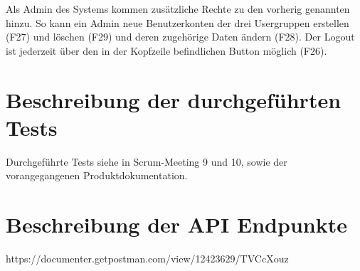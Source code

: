 \documentclass[a4paper,report,headsepline]{scrreprt}
\begin{document}
Als Admin des Systems kommen zusätzliche Rechte zu den vorherig genannten hinzu. So kann ein Admin neue Benutzerkonten der drei Usergruppen erstellen (F27) und löschen (F29) und deren zugehörige Daten ändern (F28). Der Logout ist jederzeit über den in der Kopfzeile befindlichen Button möglich (F26).

\chapter{Beschreibung der durchgeführten Tests}
Durchgeführte Tests siehe in Scrum-Meeting 9 und 10, sowie der vorangegangenen Produktdokumentation.
\chapter{Beschreibung der API Endpunkte}  
https://documenter.getpostman.com/view/12423629/TVCcXouz      
\end{document}
